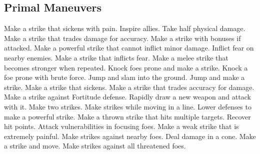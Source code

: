 \subsection{Primal Maneuvers}\label{Primal Maneuvers}
\begin{spelllist}
 Make a strike that sickens with pain.
 Inspire allies.
 Take half physical damage.
 Make a strike that trades damage for accuracy.
 Make a strike with bonuses if attacked.
 Make a powerful strike that cannot inflict minor damage.
 Inflict fear on nearby enemies.
 Make a strike that inflicts fear.
 Make a melee strike that becomes stronger when repeated.
 Knock foes prone and make a strike.
 Knock a foe prone with brute force.
 Jump and slam into the ground.
 Jump and make a strike.
 Make a strike that sickens.
 Make a strike that trades accuracy for damage.
 Make a strike against Fortitude defense.
 Rapidly draw a new weapon and attack with it.
 Make two strikes.
 Make strikes while moving in a line.
 Lower defenses to make a powerful strike.
 Make a thrown strike that hits multiple targets.
 Recover hit points.
 Attack vulnerabilities in focusing foes.
 Make a weak strike that is extremely painful.
 Make strikes against nearby foes.
 Deal damage in a cone.
 Make a strike and move.
 Make strikes against all threatened foes.
\end{spelllist}



\small

